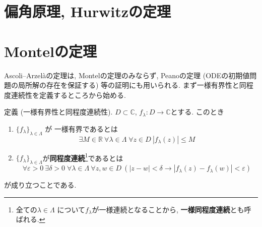 \documentclass{jsarticle}
\newcommand{\R}{\mathbb{R}}%
\newcommand{\C}{\mathbb{C}}%
\begin{document}
\section{偏角原理, Hurwitzの定理}



\section{Montelの定理}
Ascoli–Arzelàの定理は, Montelの定理のみならず, Peanoの定理 (ODEの初期値問題の局所解の存在を保証する) 等の証明にも用いられる. まず一様有界性と同程度連続性を定義するところから始める.
\begin{Def}{定義 (一様有界性と同程度連続性).}
$D\subset\C$, $f_\lambda\colon D\to \C$とする. このとき
\begin{enumerate}
\item[(i)] $\{f_\lambda\}_{\lambda\in\Lambda}\text{ が }\textbf{一様有界}\text{であるとは}$
\[
\exists M\in\R\ \forall \lambda\in\Lambda\;\forall z\in D\:|f_\lambda(z)|\le M
\]

\item[(ii)]$\{f_\lambda\}_{\lambda\in\Lambda}$が\textbf{同程度連続}\footnote{全ての$\lambda\in\Lambda$ について$f_\lambda$が一様連続となることから, \textbf{一様同程度連続}とも呼ばれる.}であるとは
\[
\forall \varepsilon>0\ \exists\delta>0\;\forall \lambda\in\Lambda\ \forall z,w\in D\:\left(|z-w|<\delta \to \left|f_\lambda(z)-f_\lambda(w)\right|<\varepsilon\right)
\]
\end{enumerate}
が成り立つことである.
\end{Def}
\end{document}
